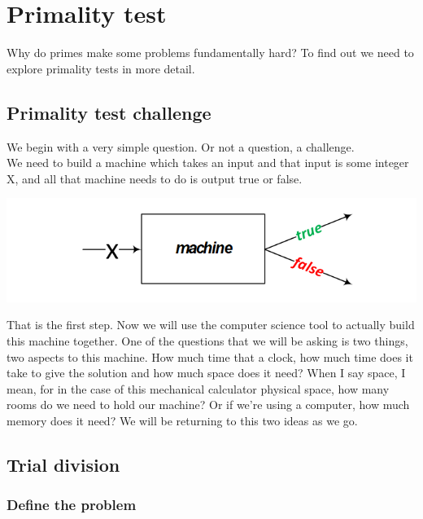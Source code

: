\documentclass{report}
\begin{document}
\chapter{Primality test}
\newpage
Why do primes make some problems fundamentally hard? To find out we need to explore primality tests in more detail.
\section{Primality test challenge}
We begin with a very simple question. Or not a question, a challenge.\\
We need to build a machine which takes an input and that input is some integer X, and all that machine needs to do is output true or false. 
\begin{center}
	\includegraphics[scale=1]{41.png}
\end{center}
That is the first step. Now we will use the computer science tool to actually build this machine together. 
One of the questions that we will be asking is two things, two aspects to this machine. How much time that a clock, how much time does it take to give the solution and how much space does it need?
When I say space, I mean, for in the case of this mechanical calculator physical space, how many rooms do we need to hold our machine? Or if we're using a computer, how much memory does it need? We will be returning to this two ideas as we go.

\section{Trial division}

\subsection{Define the problem}
\end{document}

